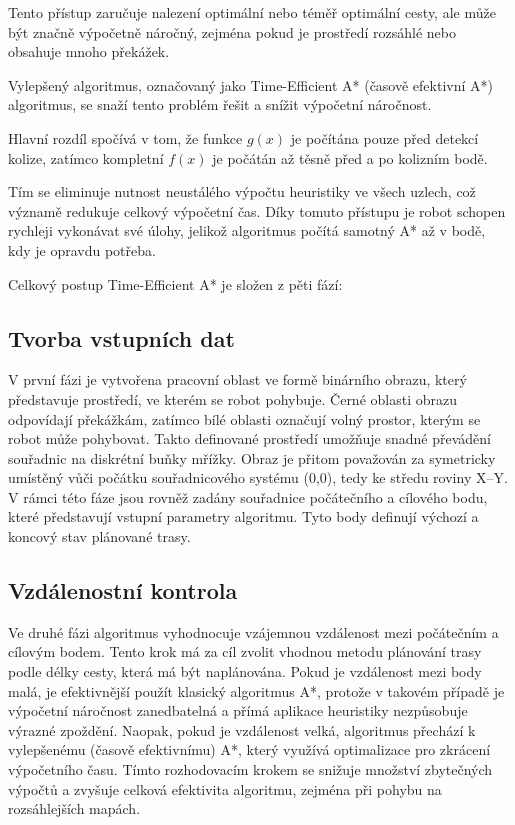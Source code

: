 \documentclass[10pt, a4paper]{article}
\begin{document}
Tento přístup zaručuje nalezení optimální nebo téměř optimální cesty, ale může být značně výpočetně náročný, zejména pokud je prostředí rozsáhlé nebo obsahuje mnoho překážek.

Vylepšený algoritmus, označovaný jako Time-Efficient A* (časově efektivní A*) algoritmus, se snaží tento problém řešit a snížit výpočetní náročnost.

Hlavní rozdíl spočívá v tom, že funkce $g(x)$ je počítána pouze před detekcí kolize, zatímco kompletní $f(x)$ je počátán až těsně před a po kolizním bodě.

Tím se eliminuje nutnost neustálého výpočtu heuristiky ve všech uzlech, což významě redukuje celkový výpočetní čas.
Díky tomuto přístupu je robot schopen rychleji vykonávat své úlohy, jelikož algoritmus počítá samotný A* až v bodě, kdy je opravdu potřeba.

Celkový postup Time-Efficient A* je složen z pěti fází:

\subsection{Tvorba vstupních dat}
V první fázi je vytvořena pracovní oblast ve formě binárního obrazu, který představuje prostředí, ve kterém se robot pohybuje.
Černé oblasti obrazu odpovídají překážkám, zatímco bílé oblasti označují volný prostor, kterým se robot může pohybovat.
Takto definované prostředí umožňuje snadné převádění souřadnic na diskrétní buňky mřížky.
Obraz je přitom považován za symetricky umístěný vůči počátku souřadnicového systému (0,0), tedy ke středu roviny X–Y.
V rámci této fáze jsou rovněž zadány souřadnice počátečního a cílového bodu, které představují vstupní parametry algoritmu.
Tyto body definují výchozí a koncový stav plánované trasy.

\subsection{Vzdálenostní kontrola}
Ve druhé fázi algoritmus vyhodnocuje vzájemnou vzdálenost mezi počátečním a cílovým bodem.
Tento krok má za cíl zvolit vhodnou metodu plánování trasy podle délky cesty, která má být naplánována.
Pokud je vzdálenost mezi body malá, je efektivnější použít klasický algoritmus A*, protože v takovém případě je výpočetní náročnost zanedbatelná a přímá aplikace heuristiky nezpůsobuje výrazné zpoždění.
Naopak, pokud je vzdálenost velká, algoritmus přechází k vylepšenému (časově efektivnímu) A*, který využívá optimalizace pro zkrácení výpočetního času.
Tímto rozhodovacím krokem se snižuje množství zbytečných výpočtů a zvyšuje celková efektivita algoritmu, zejména při pohybu na rozsáhlejších mapách.
\end{document}
